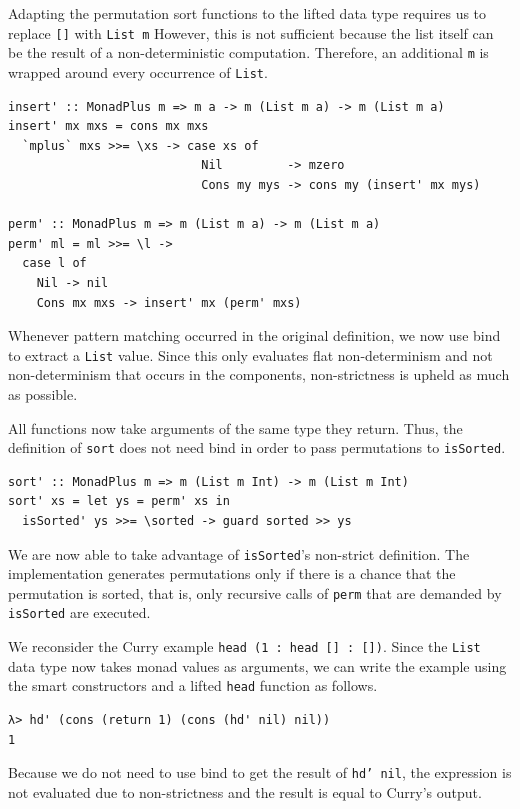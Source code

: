 \documentclass[a4paper, 11pt, fleqn, twoside]{scrreprt}
\newcommand{\hinl}[1]{\texttt{#1}}
\begin{document}
Adapting the permutation sort functions to the lifted data type requires us to replace \hinl{[]} with \hinl{List m} 
However, this is not sufficient because the list itself can be the result of a non-deterministic computation.
Therefore, an additional \hinl{m} is wrapped around every occurrence of \hinl{List}.

\begin{verbatim}
insert' :: MonadPlus m => m a -> m (List m a) -> m (List m a)
insert' mx mxs = cons mx mxs
  `mplus` mxs >>= \xs -> case xs of
                           Nil         -> mzero
                           Cons my mys -> cons my (insert' mx mys)

perm' :: MonadPlus m => m (List m a) -> m (List m a)
perm' ml = ml >>= \l ->
  case l of
    Nil -> nil
    Cons mx mxs -> insert' mx (perm' mxs)
\end{verbatim}

Whenever pattern matching occurred in the original definition, we now use bind to extract a \hinl{List} value.
Since this only evaluates flat non-determinism and not non-determinism that occurs in the components, non-strictness is upheld as much as possible.

All functions now take arguments of the same type they return.
Thus, the definition of \hinl{sort} does not need bind in order to pass permutations to \hinl{isSorted}.

\begin{verbatim}
sort' :: MonadPlus m => m (List m Int) -> m (List m Int)
sort' xs = let ys = perm' xs in
  isSorted' ys >>= \sorted -> guard sorted >> ys
\end{verbatim}

We are now able to take advantage of \hinl{isSorted}'s non-strict definition.
The implementation generates permutations only if there is a chance that the permutation is sorted, that is, only recursive calls of \hinl{perm} that are demanded by \hinl{isSorted} are executed.

We reconsider the Curry example \hinl{head (1 : head [] : [])}.
Since the \hinl{List} data type now takes monad values as arguments, we can write the example using the smart constructors and a lifted \hinl{head} function as follows.

\begin{verbatim}
λ> hd' (cons (return 1) (cons (hd' nil) nil))
1
\end{verbatim}

Because we do not need to use bind to get the result of \hinl{hd' nil}, the expression is not evaluated due to non-strictness and the result is equal to Curry's output.
\end{document}
